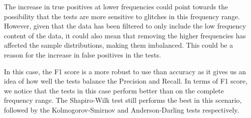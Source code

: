 \documentclass[12pt]{article}
\begin{document}
\medskip
\noindent The increase in true positives at lower frequencies could point towards the possibility that the tests are more sensitive to glitches in this frequency range. However, given that the data has been filtered to only include the low frequency content of the data, it could also mean that removing the higher frequencies has affected the sample distributions, making them imbalanced. This could be a reason for the increase in false positives in the tests.

\medskip
\noindent In this case, the F1 score is a more robust to use than accuracy as it gives us an idea of how well the tests balance the Precision and Recall. In terms of F1 score, we notice that the tests in this case perform better than on the complete frequency range. The Shapiro-Wilk test still performs the best in this scenario, followed by the Kolmogorov-Smirnov and Anderson-Darling tests respectively.

\end{document}
